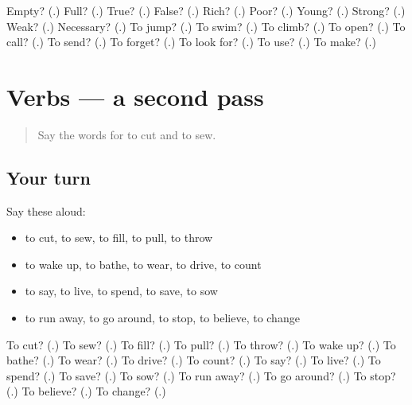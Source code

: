 \begin{tcolorbox}[breakable,colback=teal!4,colframe=teal!35!black,title={Before you move on}]
Empty? (\textbf{}.) Full? (\textbf{}.) True? (\textbf{}.) False? (\textbf{}.) Rich? (\textbf{}.) Poor? (\textbf{}.) Young? (\textbf{}.) Strong? (\textbf{}.) Weak? (\textbf{}.) Necessary? (\textbf{}.) To jump? (\textbf{}.) To swim? (\textbf{}.) To climb? (\textbf{}.) To open? (\textbf{}.) To call? (\textbf{}.) To send? (\textbf{}.) To forget? (\textbf{}.) To look for? (\textbf{}.) To use? (\textbf{}.) To make? (\textbf{}.)
\end{tcolorbox}
\section[(dialogue)]{Verbs — a second pass}

\label{lesson:GU-R143-second-pass-verbs}



\begin{quote}
Say the words for to cut and to sew.
\end{quote}

\subsection*{Your turn}
Say these aloud:

\begin{itemize}
\raggedright
  \item to cut, to sew, to fill, to pull, to throw
  \item to wake up, to bathe, to wear, to drive, to count
  \item to say, to live, to spend, to save, to sow
  \item to run away, to go around, to stop, to believe, to change
\end{itemize}

\begin{tcolorbox}[breakable,colback=teal!4,colframe=teal!35!black,title={Before you move on}]
To cut? (\textbf{}.) To sew? (\textbf{}.) To fill? (\textbf{}.) To pull? (\textbf{}.) To throw? (\textbf{}.) To wake up? (\textbf{}.) To bathe? (\textbf{}.) To wear? (\textbf{}.) To drive? (\textbf{}.) To count? (\textbf{}.) To say? (\textbf{}.) To live? (\textbf{}.) To spend? (\textbf{}.) To save? (\textbf{}.) To sow? (\textbf{}.) To run away? (\textbf{}.) To go around? (\textbf{}.) To stop? (\textbf{}.) To believe? (\textbf{}.) To change? (\textbf{}.)
\end{tcolorbox}
